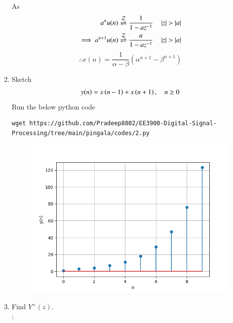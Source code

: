 \documentclass[journal,12pt,twocolumn]{IEEEtran}
\renewcommand\thesection{\arabic{section}}
\begin{document}
\begin{enumerate}[label=\thesection.\arabic*,ref=\thesection.\theenumi]
As
\begin{align}
	\label{eq:anun}
	a^nu(n) \overset{\mathcal{Z}}{ \rightleftharpoons} \frac{1}{1-az^{-1}} \quad \left\vert z\right\vert > \left\vert a\right\vert\\
	\implies a^{n+1}u(n) \overset{\mathcal{Z}}{ \rightleftharpoons} \frac{a}{1-az^{-1}} \quad \left\vert z\right\vert > \left\vert a\right\vert
\end{align}
\begin{equation} 
\therefore x(n)=\frac{1}{\alpha - \beta}(\alpha^{n+1}-\beta^{n+1})
\end{equation}
\item Sketch 
\begin{align}
	\label{eq:yn}
	y(n)	 = x\left(n-1\right) + x\left(n+1\right),  \quad n \ge 0
\end{align}
\solution
Run the below python code 
\begin{lstlisting}
wget https://github.com/Pradeep8802/EE3900-Digital-Signal-Processing/tree/main/pingala/codes/2.py
\end{lstlisting}
\begin{figure}[h]
	\centering
	\includegraphics[width=\columnwidth]{./figs/2.5.png}
	\caption{}
\end{figure}
\item Find $Y^{+}(z)$.
\\
\solution:


\end{enumerate}
\end{document}
